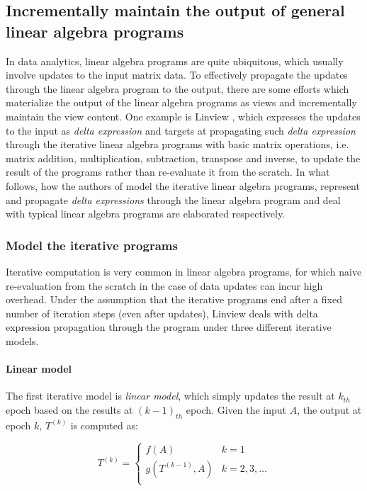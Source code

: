 \subsection{Incrementally maintain the output of general linear algebra programs}
In data analytics, linear algebra programs are quite ubiquitous, which usually involve updates to the input matrix data. To effectively propagate the updates through the linear algebra program to the output, there are some efforts which materialize the output of the linear algebra programs as views and incrementally maintain the view content. One example is Linview \cite{nikolic2014linview}, which expresses the updates to the input as {\em delta expression} and targets at propagating such {\em delta expression} through the iterative linear algebra programs with basic matrix operations, i.e. matrix addition, multiplication, subtraction, transpose and inverse, to update the result of the programs rather than re-evaluate it from the scratch. In what follows, how the authors of \cite{nikolic2014linview} model the iterative linear algebra programs, represent and propagate {\em delta expressions} through the linear algebra program and deal with typical linear algebra programs are elaborated respectively.

\subsubsection{Model the iterative programs}\label{sec: iterative_model}
Iterative computation is very common in linear algebra programs, for which naive re-evaluation from the scratch in the case of data updates can incur high overhead. Under the assumption that the iterative programs end after a fixed number of iteration steps (even after updates), Linview deals with delta expression propagation through the program under three different iterative models.

\paragraph{Linear model} The first iterative model is {\em linear model}, which simply updates the result at $k_{th}$ epoch based on the results at $(k-1)_{th}$ epoch. Given the input $A$, the output at epoch $k$, $T^{(k)}$ is computed as:

\[T^{(k)}=
\begin{cases}
f(A)& k=1\\
g(T^{(k-1)}, A) & k=2,3,\dots\\
\end{cases}
\]

